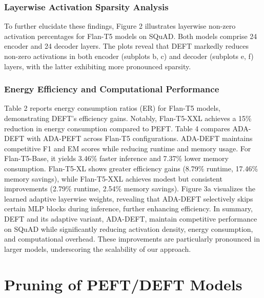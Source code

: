 \documentclass[10pt,twocolumn]{article}
\begin{document}
\subsubsection*{Layerwise Activation Sparsity Analysis}
To further elucidate these findings, Figure 2 illustrates layerwise non-zero activation percentages for Flan-T5 models on SQuAD. Both models comprise 24 encoder and 24 decoder layers. The plots reveal that DEFT markedly reduces non-zero activations in both encoder (subplots b, c) and decoder (subplots e, f) layers, with the latter exhibiting more pronounced sparsity.
\subsubsection*{Energy Efficiency and Computational Performance}
Table 2 reports energy consumption ratios (ER) for Flan-T5 models, demonstrating DEFT's efficiency gains. Notably, Flan-T5-XXL achieves a 15\% reduction in energy consumption compared to PEFT. Table 4 compares ADA-DEFT with ADA-PEFT across Flan-T5 configurations. ADA-DEFT maintains competitive F1 and EM scores while reducing runtime and memory usage. For Flan-T5-Base, it yields 3.46\% faster inference and 7.37\% lower memory consumption. Flan-T5-XL shows greater efficiency gains (8.79\% runtime, 17.46\% memory savings), while Flan-T5-XXL achieves modest but consistent improvements (2.79\% runtime, 2.54\% memory savings). Figure 3a visualizes the learned adaptive layerwise weights, revealing that ADA-DEFT selectively skips certain MLP blocks during inference, further enhancing efficiency. In summary, DEFT and its adaptive variant, ADA-DEFT, maintain competitive performance on SQuAD while significantly reducing activation density, energy consumption, and computational overhead. These improvements are particularly pronounced in larger models, underscoring the scalability of our approach.




\section{Pruning of PEFT/DEFT Models}
\end{document}
